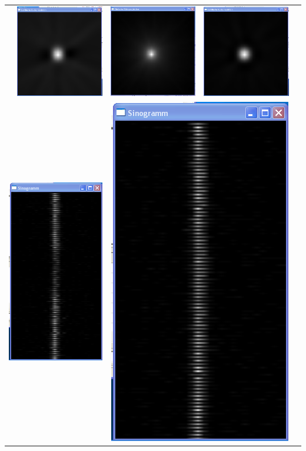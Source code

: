 \begin{longtable}{p{3cm}p{3cm}p{3cm}p{3cm}c}
                  & 
                  \includegraphics[width=.2\textwidth, height=0.125\textheight]{pic/Einzelfenster_Bilder/inhomogene_Messung/inhomo5gef_prj.png}
                  &
                  \includegraphics[width=.2\textwidth, height=0.125\textheight]{pic/Einzelfenster_Bilder/isotrope_Messung/iso6einf_prj.png}
                  & 
                  \includegraphics[width=.2\textwidth, height=0.125\textheight]{pic/Einzelfenster_Bilder/isotrope_Messung/iso6gef_prj.png}\\
                  \multicolumn{2}{c}{\includegraphics[width=.2\textwidth, height=0.25\textheight]{pic/Einzelfenster_Bilder/inhomogene_Messung/inhomo5sino.png}}
                  &
                  \multicolumn{2}{c}{\includegraphics[width=.2\textwidth, height=0.25\textheight]{pic/Einzelfenster_Bilder/isotrope_Messung/iso6sino.png}}
           \end{longtable}
        
